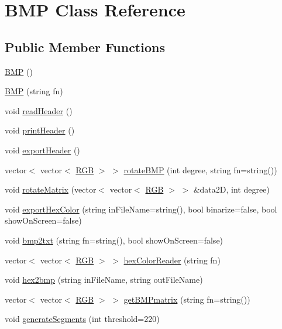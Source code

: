 \hypertarget{class_b_m_p}{}\section{B\+MP Class Reference}
\label{class_b_m_p}
\subsection*{Public Member Functions}
\begin{DoxyCompactItemize}
\item 
\hyperlink{class_b_m_p_a4876e9c343e660f4fff12d223da8f172}{B\+MP} ()
\item 
\hyperlink{class_b_m_p_af57a7e5bacdcec42034e14b77da799fb}{B\+MP} (string fn)
\item 
void \hyperlink{class_b_m_p_a73c98c805db05cfb66066193c5695bc2}{read\+Header} ()
\item 
void \hyperlink{class_b_m_p_aa61c050a8592256dfd89b663c2da5498}{print\+Header} ()
\item 
void \hyperlink{class_b_m_p_ae099cf277a98042eadb950528b4fe230}{export\+Header} ()
\item 
vector$<$ vector$<$ \hyperlink{class_r_g_b}{R\+GB} $>$ $>$ \hyperlink{class_b_m_p_a3a54abff00eb91176cc5a6cebf1dc986}{rotate\+B\+MP} (int degree, string fn=string())
\item 
void \hyperlink{class_b_m_p_a0303cc2b3dcf6164fc97ff479fecb256}{rotate\+Matrix} (vector$<$ vector$<$ \hyperlink{class_r_g_b}{R\+GB} $>$ $>$ \&data2D, int degree)
\item 
void \hyperlink{class_b_m_p_a9e3f6b1337e87cc82f492d4adb37a38e}{export\+Hex\+Color} (string in\+File\+Name=string(), bool binarize=false, bool show\+On\+Screen=false)
\item 
void \hyperlink{class_b_m_p_a323b6fc36c025c9977fc86a34f8205da}{bmp2txt} (string fn=string(), bool show\+On\+Screen=false)
\item 
vector$<$ vector$<$ \hyperlink{class_r_g_b}{R\+GB} $>$ $>$ \hyperlink{class_b_m_p_a34a823512edc76be1c1a3ebd8fcbda6c}{hex\+Color\+Reader} (string fn)
\item 
void \hyperlink{class_b_m_p_a76ec886153ad936381858fd3f68b26b0}{hex2bmp} (string in\+File\+Name, string out\+File\+Name)
\item 
vector$<$ vector$<$ \hyperlink{class_r_g_b}{R\+GB} $>$ $>$ \hyperlink{class_b_m_p_add1babaab910512574cc16a01f115b0b}{get\+B\+M\+Pmatrix} (string fn=string())
\item 
void \hyperlink{class_b_m_p_a36ad6a7f4f9036dddd1f7adadf32d12e}{generate\+Segments} (int threshold=220)

\end{DoxyCompactItemize}
